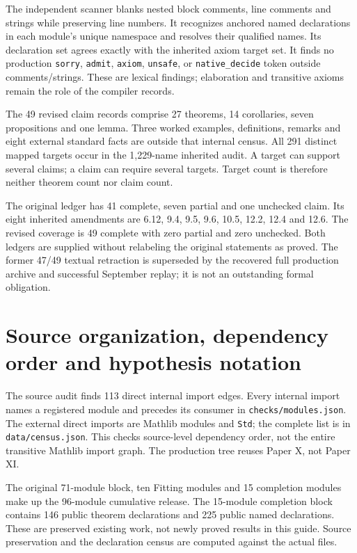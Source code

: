 \documentclass[11pt]{article}
\newcommand{\code}[1]{\nolinkurl{#1}}
\begin{document}
The independent scanner blanks nested block comments, line comments and strings while preserving line numbers. It recognizes anchored named declarations in each module's unique namespace and resolves their qualified names. Its declaration set agrees exactly with the inherited axiom target set. It finds no production \code{sorry}, \code{admit}, \code{axiom}, \code{unsafe}, or \code{native_decide} token outside comments/strings. These are lexical findings; elaboration and transitive axioms remain the role of the compiler records.

The 49 revised claim records comprise 27 theorems, 14 corollaries, seven propositions and one lemma. Three worked examples, definitions, remarks and eight external standard facts are outside that internal census. All 291 distinct mapped targets occur in the 1,229-name inherited audit. A target can support several claims; a claim can require several targets. Target count is therefore neither theorem count nor claim count.

The original ledger has 41 complete, seven partial and one unchecked claim. Its eight inherited amendments are 6.12, 9.4, 9.5, 9.6, 10.5, 12.2, 12.4 and 12.6. The revised coverage is 49 complete with zero partial and zero unchecked. Both ledgers are supplied without relabeling the original statements as proved. The former 47/49 textual retraction is superseded by the recovered full production archive and successful September replay; it is not an outstanding formal obligation.

\section{Source organization, dependency order and hypothesis notation}
The source audit finds 113 direct internal import edges. Every internal import names a registered module and precedes its consumer in \code{checks/modules.json}. The external direct imports are Mathlib modules and \code{Std}; the complete list is in \code{data/census.json}. This checks source-level dependency order, not the entire transitive Mathlib import graph. The production tree reuses Paper X, not Paper XI.

The original 71-module block, ten Fitting modules and 15 completion modules make up the 96-module cumulative release. The 15-module completion block contains 146 public theorem declarations and 225 public named declarations. These are preserved existing work, not newly proved results in this guide. Source preservation and the declaration census are computed against the actual files.
\end{document}

